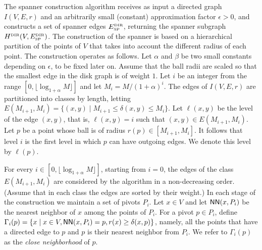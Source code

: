 \documentclass[proceedings]{stacs}
\theoremstyle{plain}\newtheorem{satz}[thm]{Satz}
\theoremstyle{definition}\newtheorem{crucial}[thm]{Crucial Definition}
\newcommand{\NN}{\mbox{\sf NN}}
\def\SP{\mbox{\tiny SP}}
\def\DIR{\mbox{\tiny DIR}}
\begin{document}
The spanner construction algorithm receives as input a directed
graph $I(V,E,r)$ and an arbitrarily small (constant) approximation
factor $\epsilon>0$, and constructs a set of spanner edges
$E_{\SP}^{\DIR}$, returning the spanner subgraph
$H^{\DIR}(V,E_{\SP}^{\DIR})$. The construction of the spanner is
based on a hierarchical partition of the points of $V$ that takes
into account the different radius of each point. The construction
operates as follows. Let $\alpha$ and $\beta$ be two small
constants depending on $\epsilon$, to be fixed later on. Assume
that the ball radii are scaled so that the smallest edge in the
disk graph is of weight $1$. Let $i$ be an integer from the range
$[0,\lfloor \log_{1+\alpha}M\rfloor]$ and let $M_i=M /
(1+\alpha)^i$. The edges of $I(V,E,r)$ are partitioned into
classes by length, letting $E(M_{i+1},M_i) = \{ (x,y) \mid M_{i+1}
\leq \delta(x,y) \leq M_i \}$. Let $\ell(x,y)$ be the level of the
edge $(x,y)$, that is, $\ell(x,y)=i$ such that $(x,y) \in
E(M_{i+1},M_i)$. Let $p$ be a point whose ball is of radius
$r(p)\in [M_{i+1},M_i]$. It follows that level $i$ is the first
level in which $p$ can have outgoing edges. We denote this level
by $\ell(p)$.

For every $i \in [0,\lfloor \log_{1+\alpha}M\rfloor]$, starting
from $i=0$, the edges of the class $E(M_{i+1},M_i)$ are considered
by the algorithm in a non-decreasing order. (Assume that in each
class the edges are sorted by their weight.) In each stage of the
construction we maintain a set of pivots $P_i$. Let $x\in V$ and
let $\NN(x,P_i)$ be the nearest neighbor of $x$ among the points
of $P_i$. For a pivot $p\in P_i$, define $\Gamma_i(p)= \{ x \mid x
\in V, \NN(x,P_i) = p, r(x)\geq \delta(x,p) \}$, namely, all the
points that have a directed edge to $p$ and $p$ is their nearest
neighbor from $P_i$. We refer to $\Gamma_i(p)$ as the {\em close
neighborhood} of $p$.
\end{document}
